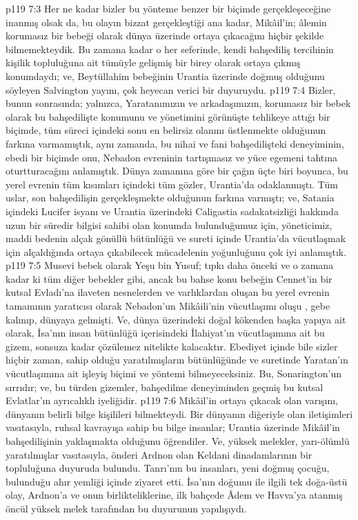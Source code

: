 \vs p119 7:3 Her ne kadar bizler bu yönteme benzer bir biçimde gerçekleşeceğine inanmış olsak da, bu olayın bizzat gerçekleştiği ana kadar, Mikâil’in; âlemin korumasız bir bebeği olarak dünya üzerinde ortaya çıkacağını hiçbir şekilde bilmemekteydik. Bu zamana kadar o her seferinde, kendi bahşediliş tercihinin kişilik topluluğuna ait tümüyle gelişmiş bir birey olarak ortaya çıkmış konumdaydı; ve, Beytüllahim bebeğinin Urantia üzerinde doğmuş olduğunu söyleyen Salvington yayını, çok heyecan verici bir duyuruydu.
\vs p119 7:4 Bizler, bunun sonrasında; yalnızca, Yaratanımızın ve arkadaşımızın, korumasız bir bebek olarak bu bahşedilişte konumunu ve yönetimini görünüşte tehlikeye attığı bir biçimde, tüm süreci içindeki sonu en belirsiz olanını üstlenmekte olduğunun farkına varmamıştık, aynı zamanda, bu nihai ve fani bahşedilişteki deneyiminin, ebedi bir biçimde onu, Nebadon evreninin tartışmasız ve yüce egemeni tahtına oturtturacağını anlamıştık. Dünya zamanına göre bir çağın üçte biri boyunca, bu yerel evrenin tüm kısımları içindeki tüm gözler, Urantia’da odaklanmıştı. Tüm uslar, son bahşedilişin gerçekleşmekte olduğunun farkına varmıştı; ve, Satania içindeki Lucifer isyanı ve Urantia üzerindeki Caligastia sadakatsizliği hakkında uzun bir süredir bilgisi sahibi olan konumda bulunduğumuz için, yöneticimiz, maddi bedenin alçak gönüllü bütünlüğü ve sureti içinde Urantia’da vücutlaşmak için alçaldığında ortaya çıkabilecek mücadelenin yoğunluğunu çok iyi anlamıştık.
\vs p119 7:5 Musevi bebek olarak Yeşu bin Yusuf; tıpkı daha önceki ve o zamana kadar ki tüm diğer bebekler gibi, ancak bu bahse konu bebeğin Cennet’in bir kutsal Evladı’na ilaveten nesnelerden ve varlıklardan oluşan bu yerel evrenin tamamının yaratıcısı olarak Nebadon’un Mikâili’nin vücutlaşımı oluşu , gebe kalınıp, dünyaya gelmişti. Ve, dünya üzerindeki doğal kökenden başka yapıya ait olarak, İsa’nın insan bütünlüğü içerisindeki İlahiyat’ın vücutlaşımına ait bu gizem, sonsuza kadar çözülemez nitelikte kalacaktır. Ebediyet içinde bile sizler hiçbir zaman, sahip olduğu yaratılmışların bütünlüğünde ve suretinde Yaratan’ın vücutlaşımına ait işleyiş biçimi ve yöntemi bilmeyeceksiniz. Bu, Sonarington’un sırrıdır; ve, bu türden gizemler, bahşedilme deneyiminden geçmiş bu kutsal Evlatlar’ın ayrıcalıklı iyeliğidir.
\vs p119 7:6 Mikâil’in ortaya çıkacak olan varışını, dünyanın belirli bilge kişilileri bilmekteydi. Bir dünyanın diğeriyle olan iletişimleri vasıtasıyla, ruhsal kavrayışa sahip bu bilge insanlar; Urantia üzerinde Mikâil’in bahşedilişinin yaklaşmakta olduğunu öğrendiler. Ve, yüksek melekler, yarı\hyp{}ölümlü yaratılmışlar vasıtasıyla, önderi Ardnon olan Keldani dinadamlarının bir topluluğuna duyuruda bulundu. Tanrı’nın bu insanları, yeni doğmuş çocuğu, bulunduğu ahır yemliği içinde ziyaret etti. İsa’nın doğumu ile ilgili tek doğa\hyp{}üstü olay, Ardnon’a ve onun birlikteliklerine, ilk bahçede Âdem ve Havva’ya atanmış öncül yüksek melek tarafından bu duyurunun yapılışıydı.
